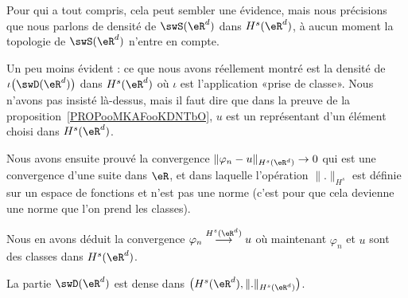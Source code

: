 \begin{remark}
    Pour qui a tout compris, cela peut sembler une évidence, mais nous précisions que nous parlons de densité de \( \swS(\eR^d)\) dans \( H^s(\eR^d)\), à aucun moment la topologie de \( \swS(\eR^d)\) n'entre en compte.

    Un peu moins évident : ce que nous avons réellement montré est la densité de \( \iota\big( \swD(\eR^d) \big)\) dans \( H^s(\eR^d)\) où \( \iota\) est l'application «prise de classe». Nous n'avons pas insisté là-dessus, mais il faut dire que dans la preuve de la proposition~\ref{PROPooMKAFooKDNTbO}, \( u\) est un représentant d'un élément choisi dans \( H^s(\eR^d)\).

    Nous avons ensuite prouvé la convergence \( \| \varphi_n-u \|_{H^s(\eR^d)}\to 0\) qui est une convergence d'une suite dans \( \eR\), et dans laquelle l'opération \( \| . \|_{H^s}\) est définie sur un espace de fonctions et n'est pas une norme (c'est pour que cela devienne une norme que l'on prend les classes).

    Nous en avons déduit la convergence \( \varphi_n\stackrel{H^s(\eR^d)}{\longrightarrow}u\) où maintenant \( \varphi_n\) et \( u\) sont des classes dans \( H^s(\eR^d)\).
\end{remark}

\begin{proposition}     \label{PROPooLIQJooKpWtnV}
    La partie \( \swD(\eR^d)\) est dense dans \( \big( H^s(\eR^d),\| . \|_{H^s(\eR^d)} \big)\).
\end{proposition}

